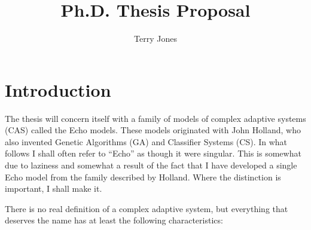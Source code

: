 
%
%



\title {{\bf Ph.D. Thesis Proposal}}

\author
{Terry Jones}

\maketitle

\section{Introduction}

The thesis will concern itself with a family of models of complex
adaptive systems (CAS) called the Echo models. These models
originated with John Holland, who also invented Genetic Algorithms
(GA) and Classifier Systems (CS). In what follows I shall often
refer to ``Echo'' as though it were singular. This is somewhat due to
laziness and somewhat a result of the fact that I have developed a
single Echo model from the family described by Holland. Where the
distinction is important, I shall make it.

There is no real definition of a complex adaptive system, but
everything that deserves the name has at least the following
characteristics:

